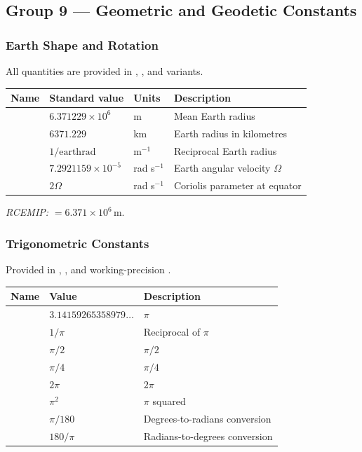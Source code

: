\subsection{Group 9 --- Geometric and Geodetic Constants}

\subsubsection{Earth Shape and Rotation}

All quantities are provided in , , and  variants.

\begin{longtable}{L{3.5cm} L{4.5cm} L{2.5cm} L{3.5cm}}
  \toprule
  \textbf{Name} & \textbf{Standard value} & \textbf{Units} & \textbf{Description} \\
  \midrule
  \endhead
  \bottomrule
  \endfoot
    & $6.371229\times10^6$ & m          & Mean Earth radius \\
        & $6371.229$           & km         & Earth radius in kilometres \\
   & $1/\text{earthrad}$  & m$^{-1}$   & Reciprocal Earth radius \\
       & $7.2921159\times10^{-5}$ & rad s$^{-1}$ & Earth angular velocity $\Omega$ \\
      & $2\Omega$            & rad s$^{-1}$& Coriolis parameter at equator \\
\end{longtable}

\textit{RCEMIP:}  $= 6.371\times10^6$\,m.

\subsubsection{Trigonometric Constants}

Provided in , , and working-precision .

\begin{longtable}{L{3.5cm} L{4cm} L{6.5cm}}
  \toprule
  \textbf{Name} & \textbf{Value} & \textbf{Description} \\
  \midrule
  \endhead
  \bottomrule
  \endfoot
    & $3.14159265358979\ldots$ & $\pi$ \\
     & $1/\pi$                  & Reciprocal of $\pi$ \\
    & $\pi/2$                  & $\pi/2$ \\
   & $\pi/4$                  & $\pi/4$ \\
     & $2\pi$                   & $2\pi$ \\
     & $\pi^2$                  & $\pi$ squared \\
    & $\pi/180$                & Degrees-to-radians conversion \\
    & $180/\pi$                & Radians-to-degrees conversion \\
\end{longtable}


